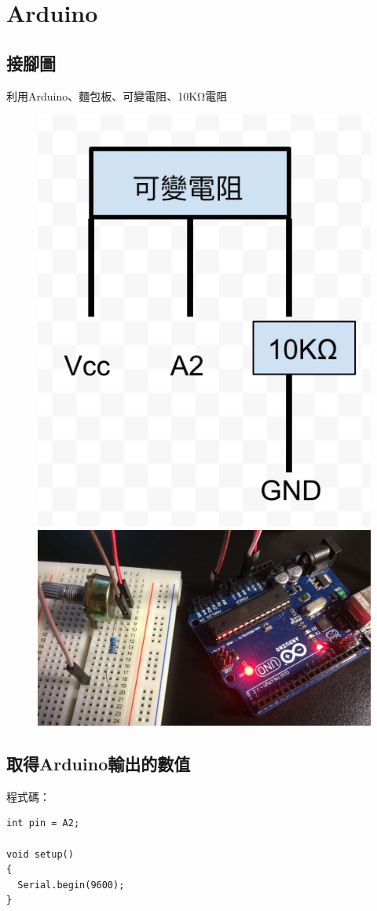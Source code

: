 \documentclass[12pt,a4paper]{article}
\begin{document}
\section{Arduino}
{
\subsection{接腳圖}
利用Arduino、麵包板、可變電阻、10KΩ電阻
\begin{figure}[ht]
\centering
\includegraphics[width=.6\textwidth]{image/接腳示意圖.jpg}
\centering
\includegraphics[width=.6\textwidth]{image/接腳圖.jpg}
\end{figure}

\subsection{取得Arduino輸出的數值}

程式碼：
\begin{shaded}
\begin{lstlisting}[language=Arduino]
int pin = A2;

void setup()
{
  Serial.begin(9600);
}


\end{lstlisting}
\end{shaded}}
\end{document}

